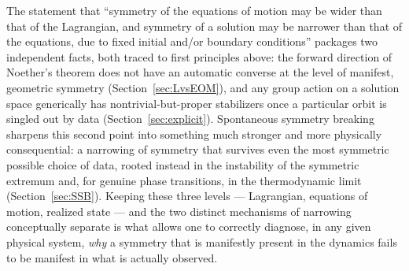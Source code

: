 \documentclass[11pt]{article}
\theoremstyle{definition}
\theoremstyle{remark}
\begin{document}
The statement that ``symmetry of the equations of motion may be wider than that of the Lagrangian, and symmetry of a solution may be narrower than that of the equations, due to fixed initial and/or boundary conditions'' packages two independent facts, both traced to first principles above: the forward direction of Noether's theorem does not have an automatic converse at the level of manifest, geometric symmetry (Section~\ref{sec:LvsEOM}), and any group action on a solution space generically has nontrivial-but-proper stabilizers once a particular orbit is singled out by data (Section~\ref{sec:explicit}). Spontaneous symmetry breaking sharpens this second point into something much stronger and more physically consequential: a narrowing of symmetry that survives even the most symmetric possible choice of data, rooted instead in the instability of the symmetric extremum and, for genuine phase transitions, in the thermodynamic limit (Section~\ref{sec:SSB}). Keeping these three levels — Lagrangian, equations of motion, realized state — and the two distinct mechanisms of narrowing conceptually separate is what allows one to correctly diagnose, in any given physical system, \emph{why} a symmetry that is manifestly present in the dynamics fails to be manifest in what is actually observed.
\end{document}
